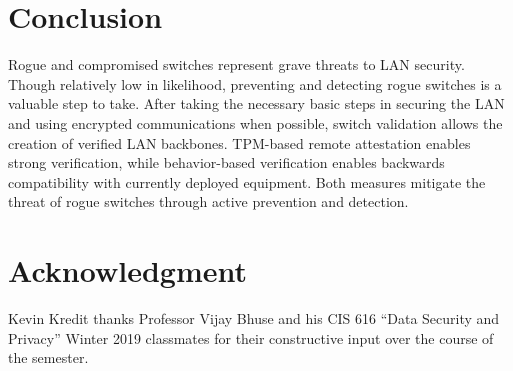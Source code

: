 \documentclass[journal]{IEEEtran}
\begin{document}
\section{Conclusion}
Rogue and compromised switches represent grave threats to LAN security. Though relatively low in
likelihood, preventing and detecting rogue switches is a valuable step to take. After taking the
necessary basic steps in securing the LAN and using encrypted communications when possible,
switch validation allows the creation of verified LAN backbones. TPM-based remote attestation
enables strong verification, while behavior-based verification enables backwards compatibility with
currently deployed equipment. Both measures mitigate the threat of rogue switches through active
prevention and detection.








\section*{Acknowledgment}
Kevin Kredit thanks Professor Vijay Bhuse and his CIS 616 ``Data Security and Privacy'' Winter 2019
classmates for their constructive input over the course of the semester.
\end{document}
